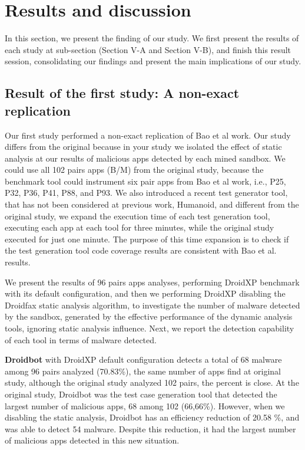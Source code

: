 \section{Results and discussion}

In this section, we present the finding of our study. We first present the results of each study at sub-section (Section V-A and Section V-B), and finish this result session, consolidating our findings and present the main implications of our study.

\subsection{Result of the first study: A non-exact replication}

Our first study performed a non-exact replication of Bao et al work. Our study differs from the original because in your study we isolated the effect of static analysis at our results of malicious apps detected by each mined sandbox. We could use all 102 pairs apps (B/M) from the original study, because the benchmark tool could instrument six pair apps from Bao et al work, i.e., P25, P32, P36, P41, P88, and P93. We also introduced a recent test generator tool, that has not been considered at previous work, Humanoid, and different from the original study, we expand the execution time of each test generation tool, executing each app at each tool for three minutes, while the original study executed for just one minute. The purpose of this time expansion is to check if the test generation tool code coverage results are consistent with Bao et al. results.

We present the results of 96 pairs apps analyses, performing DroidXP benchmark with its default configuration, and then we performing DroidXP disabling the Droidfax static analysis algorithm, to investigate the number of malware detected by the sandbox, generated by the effective performance of the dynamic analysis tools, ignoring static analysis influence. Next, we report the detection capability of each tool in terms of malware detected.

\textbf{Droidbot} with DroidXP default configuration detects a total of 68 malware among 96 pairs analyzed (70.83\%), the same number of apps find at original study, although the original study analyzed 102 pairs, the percent is close. At the original study, Droidbot was the test case generation tool that detected the largest number of malicious apps, 68 among 102 (66,66\%). However, when we disabling the static analysis, Droidbot has an efficiency reduction of 20.58 \%, and was able to detect 54 malware. Despite this reduction, it had the largest number of malicious apps detected in this new situation.


